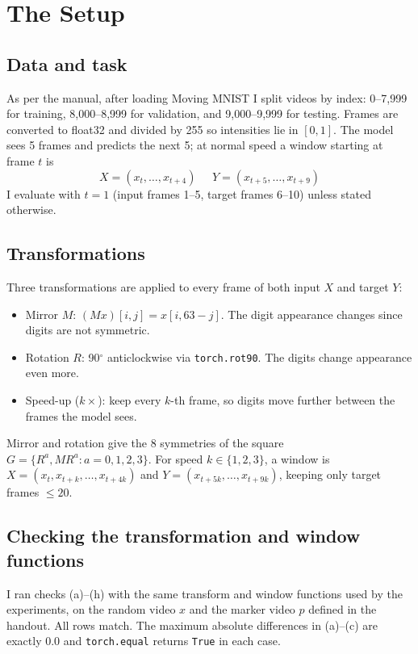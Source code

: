 \documentclass[11pt,letterpaper]{article}
\begin{document}
\section*{The Setup}

\subsection*{Data and task}

As per the manual, after loading Moving MNIST I split videos by index: 0--7,999 for training, 8,000--8,999 for
validation, and 9,000--9,999 for testing. Frames are converted to float32 and
divided by 255 so intensities lie in $[0,1]$. The model sees 5 frames and predicts
the next 5; at normal speed a window starting at frame $t$ is
\[X = (x_t, \dots, x_{t+4}) \; \; \; \; \; Y = (x_{t+5}, \dots, x_{t+9})\]
I evaluate with $t=1$ (input frames 1--5, target frames 6--10) unless stated otherwise.

\subsection*{Transformations}

Three transformations are applied to every frame of both input $X$ and target $Y$:

\begin{itemize}
  \item {Mirror $M$:} $(M x)[i,j] = x[i, 63-j]$. The digit appearance changes since digits are not symmetric.
  \item {Rotation $R$:} 90$^\circ$ anticlockwise via \texttt{torch.rot90}. The digits change appearance even more.
  \item {Speed-up ($k\times$):} keep every $k$-th frame, so digits move further between the frames the model sees.
\end{itemize}

Mirror and rotation give the 8 symmetries of the square $G = \{R^a, M R^a : a=0,1,2,3\}$. For speed $k \in \{1,2,3\}$, a window is $X = (x_t, x_{t+k}, \dots, x_{t+4k})$ and $Y = (x_{t+5k}, \dots, x_{t+9k})$, keeping only target frames $\le 20$.

\subsection*{Checking the transformation and window functions}

I ran checks (a)--(h) with the same transform and window functions used by the
experiments, on the random video $x$ and the marker video $p$ defined in the
handout. All rows match. The maximum absolute differences in (a)--(c) are
exactly $0.0$ and \texttt{torch.equal} returns \texttt{True} in each case.
\end{document}
